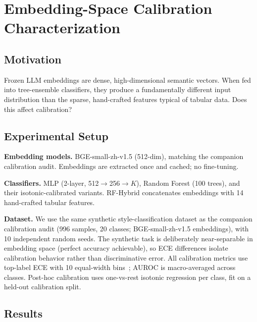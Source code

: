 \documentclass[11pt]{article}
\begin{document}
\section{Embedding-Space Calibration Characterization}
\label{sec:embedding}

\subsection{Motivation}

Frozen LLM embeddings are dense, high-dimensional semantic vectors. When fed into tree-ensemble classifiers, they produce a fundamentally different input distribution than the sparse, hand-crafted features typical of tabular data. Does this affect calibration?

\subsection{Experimental Setup}

\textbf{Embedding models.} BGE-small-zh-v1.5 (512-dim), matching the companion calibration audit. Embeddings are extracted once and cached; no fine-tuning.

\textbf{Classifiers.} MLP (2-layer, 512$\to$256$\to$$K$), Random Forest (100 trees), and their isotonic-calibrated variants. RF-Hybrid concatenates embeddings with 14 hand-crafted tabular features.

\textbf{Dataset.} We use the same synthetic style-classification dataset as the companion calibration audit (996 samples, 20 classes; BGE-small-zh-v1.5 embeddings), with 10 independent random seeds. The synthetic task is deliberately near-separable in embedding space (perfect accuracy achievable), so ECE differences isolate calibration behavior rather than discriminative error. All calibration metrics use top-label ECE with 10 equal-width bins~\cite{guo2017calibration}; AUROC is macro-averaged across classes. Post-hoc calibration uses one-vs-rest isotonic regression per class, fit on a held-out calibration split.

\subsection{Results}
\end{document}
